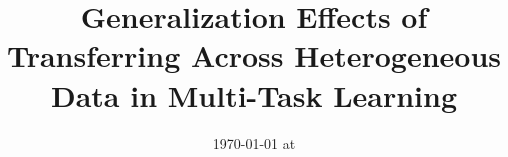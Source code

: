\documentclass{article}
\begin{document}
\title{Generalization Effects of Transferring Across Heterogeneous Data in Multi-Task Learning}
\date{}
\maketitle
\date{{\ddmmyyyydate\today} at \currenttime}





%

%





\appendix







\end{document}
